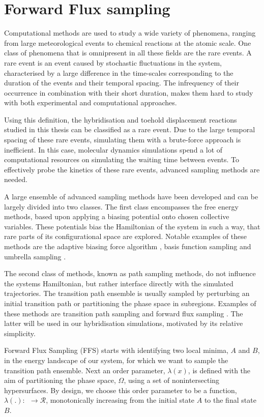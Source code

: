 \section{Forward Flux sampling}

Computational methods are used to study a wide variety of phenomena, ranging from
large meteorological events to chemical reactions at the atomic scale. One class of
phenomena that is omnipresent in all these fields are the rare events. A rare event is an
event caused by stochastic fluctuations in the system, characterised by a large
difference in the time-scales corresponding to the duration of the events and their
temporal spacing. The infrequency of their occurrence in combination with their short
duration, makes them hard to study with both experimental and computational approaches.

Using this definition, the hybridisation and toehold displacement reactions studied in
this thesis can be classified as a rare event. Due to
the large temporal spacing of these rare events, simulating them with a brute-force
approach is inefficient. In this case, molecular dynamics simulations spend a lot of
computational resources on simulating the waiting time between events. To
effectively probe the kinetics of these rare events, advanced sampling methods are
needed.

A large ensemble of advanced sampling methods have been developed and can be largely
divided into two classes. The first class encompasses the free energy methods, based upon
applying a biasing potential onto chosen collective variables. These potentials bias the
Hamiltonian of the system in such a way, that rare parts of its configurational space are
explored. Notable examples of these methods are the adaptive biasing force algorithm
\cite{Comer2015}, basis function sampling\cite{Whitmer2014} and umbrella sampling
\cite{Kästner2011}.

The second class of methods, known as path sampling methods, do not influence the
systems Hamiltonian, but rather interface directly with the simulated trajectories. The
transition path ensemble is usually sampled by perturbing an initial transition path or
partitioning the phase space in subregions. Examples of these methods are transition
path sampling \cite{Dellago2002} and forward flux sampling \cite{Allen2006}
\cite{Allen2009}.  The latter
will be used in our
hybridisation simulations, motivated by its relative simplicity.

Forward Flux Sampling (FFS) starts with identifying two local minima, $A$ and $B$, in the
energy landscape of our system, for which we want to sample the transition path ensemble.
Next an order parameter, $\lambda(x)$, is defined with the aim of partitioning the
phase space, $\Omega$, using a set of nonintersecting hypersurfaces. By design, we
choose this order parameter to be a function, $\lambda(.):\ $\Omega$\ \rightarrow
\mathcal{R}$, monotonically increasing from the initial state $A$ to the final
state $B$.

